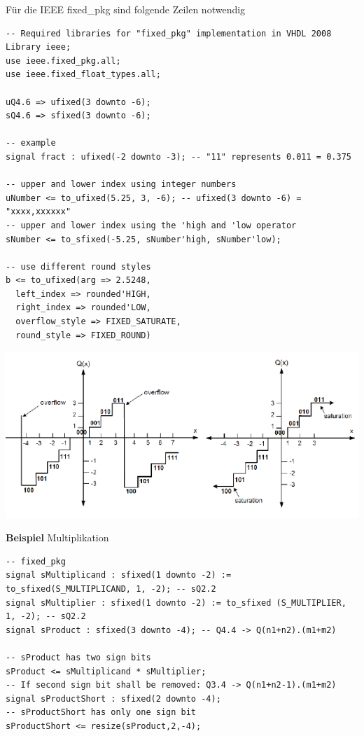 Für die IEEE fixed\_pkg sind folgende Zeilen notwendig
\begin{lstlisting}
-- Required libraries for "fixed_pkg" implementation in VHDL 2008
Library ieee;
use ieee.fixed_pkg.all;
use ieee.fixed_float_types.all;

uQ4.6 => ufixed(3 downto -6);
sQ4.6 => sfixed(3 downto -6);

-- example
signal fract : ufixed(-2 downto -3); -- "11" represents 0.011 = 0.375

-- upper and lower index using integer numbers
uNumber <= to_ufixed(5.25, 3, -6); -- ufixed(3 downto -6) = "xxxx,xxxxxx"
-- upper and lower index using the 'high and 'low operator
sNumber <= to_sfixed(-5.25, sNumber'high, sNumber'low);

-- use different round styles
b <= to_ufixed(arg => 2.5248,
  left_index => rounded'HIGH,
  right_index => rounded'LOW,
  overflow_style => FIXED_SATURATE,
  round_style => FIXED_ROUND)
\end{lstlisting}

\begin{center}
	\includegraphics[width=\columnwidth]{Images/saturation}
\end{center}

\textbf{Beispiel} Multiplikation
\begin{lstlisting}
-- fixed_pkg
signal sMultiplicand : sfixed(1 downto -2) := to_sfixed(S_MULTIPLICAND, 1, -2); -- sQ2.2
signal sMultiplier : sfixed(1 downto -2) := to_sfixed (S_MULTIPLIER, 1, -2); -- sQ2.2
signal sProduct : sfixed(3 downto -4); -- Q4.4 -> Q(n1+n2).(m1+m2)

-- sProduct has two sign bits
sProduct <= sMultiplicand * sMultiplier;
-- If second sign bit shall be removed: Q3.4 -> Q(n1+n2-1).(m1+m2)
signal sProductShort : sfixed(2 downto -4);
-- sProductShort has only one sign bit
sProductShort <= resize(sProduct,2,-4);
\end{lstlisting}

